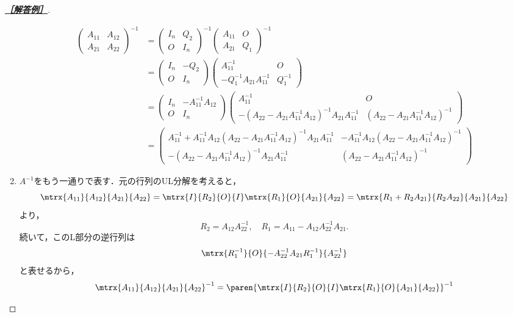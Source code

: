 \documentclass[uplatex,dvipdfmx]{jsarticle}
\begin{document}
\begin{proof}[\textbf{\underline{［解答例］}}]
\begin{enumerate}
        \begin{align*}
            \begin{pmatrix}
                A_{11}&A_{12}\\A_{21}&A_{22}
            \end{pmatrix}^{-1}&=\begin{pmatrix}I_n&Q_2\\O&I_n\end{pmatrix}^{-1}\begin{pmatrix}A_{11}&O\\A_{21}&Q_1\end{pmatrix}^{-1}\\
            &=\begin{pmatrix}I_n&-Q_2\\O&I_n\end{pmatrix}\begin{pmatrix}A_{11}^{-1}&O\\-Q_1^{-1}A_{21}A_{11}^{-1}&Q_1^{-1}\end{pmatrix}\\
            &=\begin{pmatrix}I_n&-A_{11}^{-1}A_{12}\\O&I_n\end{pmatrix}\begin{pmatrix}A_{11}^{-1}&O\\-(A_{22}-A_{21}A_{11}^{-1}A_{12})^{-1}A_{21}A_{11}^{-1}&(A_{22}-A_{21}A_{11}^{-1}A_{12})^{-1}\end{pmatrix}\\
            &=\begin{pmatrix}A_{11}^{-1}+A_{11}^{-1}A_{12}(A_{22}-A_{21}A_{11}^{-1}A_{12})^{-1}A_{21}A_{11}^{-1}&-A_{11}^{-1}A_{12}(A_{22}-A_{21}A_{11}^{-1}A_{12})^{-1}\\-(A_{22}-A_{21}A_{11}^{-1}A_{12})^{-1}A_{21}A_{11}^{-1}&(A_{22}-A_{21}A_{11}^{-1}A_{12})^{-1}\end{pmatrix}
        \end{align*}
        \item $A^{-1}$をもう一通りで表す．元の行列のUL分解を考えると，
        \[\mtrx{A_{11}}{A_{12}}{A_{21}}{A_{22}}=\mtrx{I}{R_2}{O}{I}\mtrx{R_1}{O}{A_{21}}{A_{22}}=\mtrx{R_1+R_2A_{21}}{R_2A_{22}}{A_{21}}{A_{22}}\]
        より，
        \[R_2=A_{12}A_{22}^{-1},\quad R_1=A_{11}-A_{12}A_{22}^{-1}A_{21}.\]
        続いて，このL部分の逆行列は
        \[\mtrx{R_1^{-1}}{O}{-A_{22}^{-1}A_{21}R_1^{-1}}{A_{22}^{-1}}\]
        と表せるから，
        \begin{align*}
            \mtrx{A_{11}}{A_{12}}{A_{21}}{A_{22}}^{-1}&=\paren{\mtrx{I}{R_2}{O}{I}\mtrx{R_1}{O}{A_{21}}{A_{22}}}^{-1}\\

\end{align*}
\end{enumerate}
\end{proof}
\end{document}
